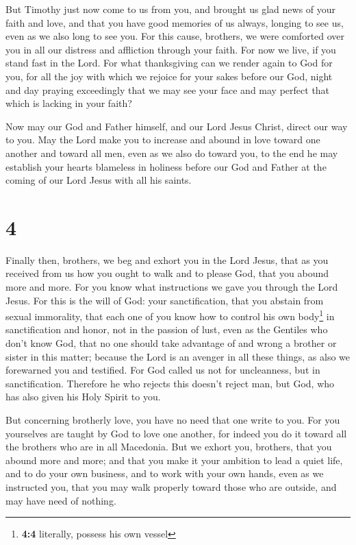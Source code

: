  But Timothy just now come to us from you, and brought us
glad news of your faith and love, and that you have good memories of us
always, longing to see us, even as we also long to see you.
 For this cause, brothers, we were comforted over you in
all our distress and affliction through your faith.  For
now we live, if you stand fast in the Lord.  For what
thanksgiving can we render again to God for you, for all the joy with
which we rejoice for your sakes before our God,  night
and day praying exceedingly that we may see your face and may perfect
that which is lacking in your faith?

 Now may our God and Father himself, and our Lord Jesus
Christ, direct our way to you.  May the Lord make you to
increase and abound in love toward one another and toward all men, even
as we also do toward you,  to the end he may establish
your hearts blameless in holiness before our God and Father at the
coming of our Lord Jesus with all his saints.

\hypertarget{section-3}{%
\section{4}\label{section-3}}

 Finally then, brothers, we beg and exhort you in the Lord
Jesus, that as you received from us how you ought to walk and to please
God, that you abound more and more.  For you know what
instructions we gave you through the Lord Jesus.  For this
is the will of God: your sanctification, that you abstain from sexual
immorality,  that each one of you know how to control his
own body\footnote{\textbf{4:4} literally, possess his own vessel} in
sanctification and honor,  not in the passion of lust,
even as the Gentiles who don't know God,  that no one
should take advantage of and wrong a brother or sister in this matter;
because the Lord is an avenger in all these things, as also we
forewarned you and testified.  For God called us not for
uncleanness, but in sanctification.  Therefore he who
rejects this doesn't reject man, but God, who has also given his Holy
Spirit to you.

 But concerning brotherly love, you have no need that one
write to you. For you yourselves are taught by God to love one another,
 for indeed you do it toward all the brothers who are in
all Macedonia. But we exhort you, brothers, that you abound more and
more;  and that you make it your ambition to lead a quiet
life, and to do your own business, and to work with your own hands, even
as we instructed you,  that you may walk properly toward
those who are outside, and may have need of nothing.


